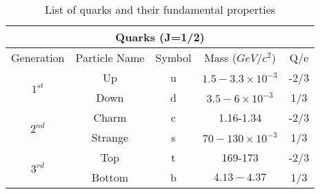 \begin{table}[!htb]
  \centering
  \begin{tabular}{|c|c|c|c|c|}
  \hline
  \multicolumn{5}{|c|}{Quarks (J=1/2)} \\
  \hline
  Generation & Particle Name & Symbol & Mass ($GeV/c^2$) & Q/e \\
  \hline
  \hline
  \multirow{2}{*}{$1^{st}$} & Up      & u & $1.5-3.3 \times 10^{-3}$ & -2/3 \\
                            & Down    & d &   $3.5-6 \times 10^{-3}$ &  1/3 \\
  \hline
  \hline
  \multirow{2}{*}{$2^{nd}$} & Charm   & c &                1.16-1.34 & -2/3 \\
                            & Strange & s &  $70-130 \times 10^{-3}$ &  1/3 \\
  \hline
  \hline
  \multirow{2}{*}{$3^{rd}$} & Top     & t &                  169-173 & -2/3 \\
                            & Bottom  & b &              $4.13-4.37$ &  1/3 \\
  \hline
  \end{tabular}
  \caption[List of quarks and their fundamental properties]{List of quarks and their fundamental properties}
  \label{TheoreticalIntroduction_QuarkProperties}
\end{table}
